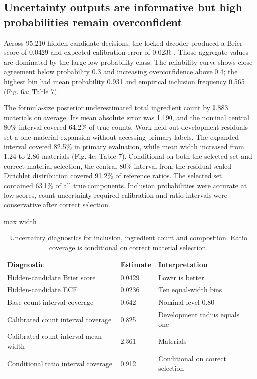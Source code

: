 \documentclass[11pt]{article}
\begin{document}
\subsection{Uncertainty outputs are informative but high probabilities remain overconfident}

Across 95,210 hidden candidate decisions, the locked decoder produced a Brier score of 0.0429 and expected calibration error of 0.0236 \cite{ref15}. Those aggregate values are dominated by the large low-probability class. The reliability curve shows close agreement below probability 0.3 and increasing overconfidence above 0.4; the highest bin had mean probability 0.931 and empirical inclusion frequency 0.565 (Fig. 6a; Table 7).

The formula-size posterior underestimated total ingredient count by 0.883 materials on average. Its mean absolute error was 1.190, and the nominal central 80\% interval covered 64.2\% of true counts. Work-held-out development residuals set a one-material expansion without accessing primary labels. The expanded interval covered 82.5\% in primary evaluation, while mean width increased from 1.24 to 2.86 materials (Fig. 4c; Table 7). Conditional on both the selected set and correct material selection, the central 80\% interval from the residual-scaled Dirichlet distribution covered 91.2\% of reference ratios. The selected set contained 63.1\% of all true components. Inclusion probabilities were accurate at low scores, count uncertainty required calibration and ratio intervals were conservative after correct selection.

\begin{table}[htbp]
\centering
\small
\caption{Uncertainty diagnostics for inclusion, ingredient count and composition. Ratio coverage is conditional on correct material selection.}
\label{tab:7}
\begin{adjustbox}{max width=\linewidth}
\begin{tabular}{@{}lll@{}}
\toprule
\textbf{Diagnostic} & \textbf{Estimate} & \textbf{Interpretation} \\
\midrule
Hidden-candidate Brier score & 0.0429 & Lower is better \\
Hidden-candidate ECE & 0.0236 & Ten equal-width bins \\
Base count interval coverage & 0.642 & Nominal level 0.80 \\
Calibrated count interval coverage & 0.825 & Development radius equals one \\
Calibrated count interval mean width & 2.861 & Materials \\
Conditional ratio interval coverage & 0.912 & Conditional on correct selection \\
\bottomrule
\end{tabular}
\end{adjustbox}
\end{table}
\end{document}
